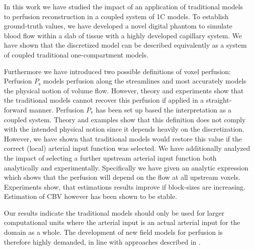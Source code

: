 \documentclass[journal,twocolumn]{IEEEtran}
\newcommand{\Perfv}{P_{\mathrm{v}}}
\newcommand{\Perfs}{P_{\mathrm{s}}}
\begin{document}
	In this work we have studied the impact of an application of traditional models to perfusion reconstruction in a coupled system of 1C models.
	To establish ground-truth values, we have developed a novel digital phantom to simulate blood flow within a slab of tissue with a highly developed capillary system.
	We have shown that the discretized model can be described equivalently as a system of coupled traditional one-compartment models.
	
	Furthermore we have introduced two possible definitions of voxel perfusion:
	Perfusion $\Perfs$ models perfusion along the streamlines and most accurately models the physical notion of volume flow.
	However, theory and experiments show that the traditional models cannot recover this perfusion if applied in a straight-forward manner.
	Perfusion $\Perfv$ has been set up based the interpretation as a coupled system.
	Theory and examples show that this definition does not comply with the intended physical notion since it depends heavily on the discretization.
	However, we have shown that traditional models would restore this value if the correct (local) arterial input function was selected.
	We have additionally analyzed the impact of selecting a further upstream arterial input function both analytically and experimentally.
	Specifically we have given an analytic expression which shows that the perfusion will depend on the flow at all upstream voxels.
	Experiments show, that estimations results improve if block-sizes are increasing.
	Estimation of CBV however has been shown to be stable.
	
	Our results indicate the traditional models should only be used for larger computational units where the arterial input is an actual arterial input for the domain as a whole. 
	The development of new field models for perfusion is therefore highly demanded, in line with approaches described in \cite{sourbron14}. 

	
		
	
	
\end{document}
